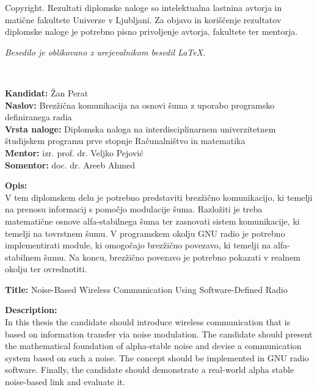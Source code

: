 \documentclass[a4paper, 12pt, openany]{book}
\newcommand{\clearemptydoublepage}{\newpage{\pagestyle{empty}\cleardoublepage}}
\begin{document}
\thispagestyle{empty}
\vspace*{8cm}

\noindent
{\sc Copyright}. 
Rezultati diplomske naloge so intelektualna lastnina avtorja in matične fakultete Univerze v Ljubljani.
Za objavo in koriščenje rezultatov diplomske naloge je potrebno pisno privoljenje avtorja, fakultete ter mentorja.

\begin{center}
\mbox{}\vfill
\emph{Besedilo je oblikovano z urejevalnikom besedil \LaTeX.}
\end{center}
\clearemptydoublepage

\thispagestyle{empty}
\
\vfill

\bigskip
\noindent\textbf{Kandidat:} Žan Perat\\
\noindent\textbf{Naslov:} Brezžična komunikacija na osnovi šuma z uporabo programsko definiranega radia\\
\noindent\textbf{Vrsta naloge:} Diplomska naloga na interdisciplinarnem univerzitetnem študijskem programu prve stopnje Računalništvo in matematika\\
\noindent\textbf{Mentor:} izr. prof. dr. Veljko Pejović\\
\noindent\textbf{Somentor:} doc. dr. Areeb Ahmed

\bigskip
\noindent\textbf{Opis:}\\
V tem diplomskem delu je potrebno predstaviti brezžično komunikacijo, ki temelji na prenosu informacij s pomočjo modulacije šuma. Razložiti je treba matematične osnove alfa-stabilnega šuma ter zasnovati sistem komunikacije, ki temelji na tovrstnem šumu. V programskem okolju GNU radio je potrebno implementirati module, ki omogočajo brezžično povezavo, ki temelji na alfa-stabilnem šumu. Na koncu, brezžično povezavo je potrebno pokazati v realnem okolju ter ovrednotiti.

\bigskip
\noindent\textbf{Title:} Noise-Based Wireless Communication Using Software-Defined Radio

\bigskip
\noindent\textbf{Description:}\\
In this thesis the candidate should introduce wireless communication that is based on information transfer via noise modulation. The candidate should present the mathematical foundation of alpha-stable noise and devise a communication system based on such a noise. The concept should be implemented in GNU radio software. Finally, the candidate should demonstrate a real-world alpha stable noise-based link and evaluate it.
\end{document}
